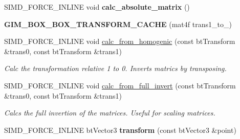 \begin{DoxyCompactItemize}
S\+I\+M\+D\+\_\+\+F\+O\+R\+C\+E\+\_\+\+I\+N\+L\+I\+NE void {\bfseries calc\+\_\+absolute\+\_\+matrix} ()
\item 
\mbox{\label{classGIM__BOX__BOX__TRANSFORM__CACHE_a68f172ea609d1c6ade9a6b26cb3db5e6}} 
{\bfseries G\+I\+M\+\_\+\+B\+O\+X\+\_\+\+B\+O\+X\+\_\+\+T\+R\+A\+N\+S\+F\+O\+R\+M\+\_\+\+C\+A\+C\+HE} (mat4f trans1\+\_\+to\+\_)
\item 
\mbox{\label{classGIM__BOX__BOX__TRANSFORM__CACHE_abdaefe67a2f2bbf2b89d0ad74fb9a4a5}} 
S\+I\+M\+D\+\_\+\+F\+O\+R\+C\+E\+\_\+\+I\+N\+L\+I\+NE void \hyperlink{classGIM__BOX__BOX__TRANSFORM__CACHE_abdaefe67a2f2bbf2b89d0ad74fb9a4a5}{calc\+\_\+from\+\_\+homogenic} (const bt\+Transform \&trans0, const bt\+Transform \&trans1)
\begin{DoxyCompactList}\small\item\em Calc the transformation relative 1 to 0. Inverts matrics by transposing. \end{DoxyCompactList}\item 
\mbox{\label{classGIM__BOX__BOX__TRANSFORM__CACHE_a29e5ec39ed30a8bc7180a90cba68dc43}} 
S\+I\+M\+D\+\_\+\+F\+O\+R\+C\+E\+\_\+\+I\+N\+L\+I\+NE void \hyperlink{classGIM__BOX__BOX__TRANSFORM__CACHE_a29e5ec39ed30a8bc7180a90cba68dc43}{calc\+\_\+from\+\_\+full\+\_\+invert} (const bt\+Transform \&trans0, const bt\+Transform \&trans1)
\begin{DoxyCompactList}\small\item\em Calcs the full invertion of the matrices. Useful for scaling matrices. \end{DoxyCompactList}\item 
\mbox{\label{classGIM__BOX__BOX__TRANSFORM__CACHE_a75dabf90de88c3077dfba3dbc2005e19}} 
S\+I\+M\+D\+\_\+\+F\+O\+R\+C\+E\+\_\+\+I\+N\+L\+I\+NE bt\+Vector3 {\bfseries transform} (const bt\+Vector3 \&point)
\end{DoxyCompactItemize}
